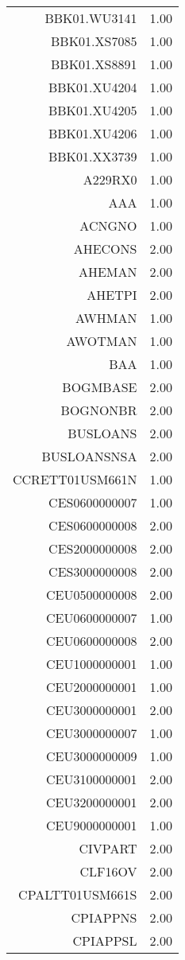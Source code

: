 \begin{table}[ht]
\begin{tabular}{rr}
  BBK01.WU3141 & 1.00 \\ 
  BBK01.XS7085 & 1.00 \\ 
  BBK01.XS8891 & 1.00 \\ 
  BBK01.XU4204 & 1.00 \\ 
  BBK01.XU4205 & 1.00 \\ 
  BBK01.XU4206 & 1.00 \\ 
  BBK01.XX3739 & 1.00 \\ 
  A229RX0 & 1.00 \\ 
  AAA & 1.00 \\ 
  ACNGNO & 1.00 \\ 
  AHECONS & 2.00 \\ 
  AHEMAN & 2.00 \\ 
  AHETPI & 2.00 \\ 
  AWHMAN & 1.00 \\ 
  AWOTMAN & 1.00 \\ 
  BAA & 1.00 \\ 
  BOGMBASE & 2.00 \\ 
  BOGNONBR & 2.00 \\ 
  BUSLOANS & 2.00 \\ 
  BUSLOANSNSA & 2.00 \\ 
  CCRETT01USM661N & 1.00 \\ 
  CES0600000007 & 1.00 \\ 
  CES0600000008 & 2.00 \\ 
  CES2000000008 & 2.00 \\ 
  CES3000000008 & 2.00 \\ 
  CEU0500000008 & 2.00 \\ 
  CEU0600000007 & 1.00 \\ 
  CEU0600000008 & 2.00 \\ 
  CEU1000000001 & 1.00 \\ 
  CEU2000000001 & 1.00 \\ 
  CEU3000000001 & 2.00 \\ 
  CEU3000000007 & 1.00 \\ 
  CEU3000000009 & 1.00 \\ 
  CEU3100000001 & 2.00 \\ 
  CEU3200000001 & 2.00 \\ 
  CEU9000000001 & 1.00 \\ 
  CIVPART & 2.00 \\ 
  CLF16OV & 2.00 \\ 
  CPALTT01USM661S & 2.00 \\ 
  CPIAPPNS & 2.00 \\ 
  CPIAPPSL & 2.00 \\ 

\end{tabular}
\end{table}

